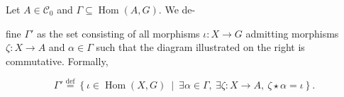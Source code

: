    
   
   
   
   
   \begin{definition}
       \label{def:weight_excluding}
       Let \( A \mathop{\in} \mathcal{C}_0 \) and $\Gamma \mathop{\subseteq} \operatorname{Hom}(A,G)$. We de-
       \newline
       \noindent
       \begin{minipage}{0.6\textwidth}
         fine $\Gamma'$ as the set consisting of all morphisms \( \iota : X \mathop{\to} G \) admitting morphisms \( \zeta \mathop{\colon} X \mathop{\to} A \) and \( \alpha \mathop{\in} \Gamma \) such that the diagram illustrated on the right is commutative. Formally, 
       \end{minipage}
       \begin{minipage}{0.4\textwidth}
           \hfill 
       \end{minipage}
   
       \[
       \Gamma' \overset{\operatorname{def}}{=} \left\{ \iota \mathop{\in} \operatorname{Hom}(X, G)~\middle|~\exists \alpha \mathop{\in} \Gamma,~\exists \zeta:X \mathop{\to} A,~\zeta \mathop{\star} \alpha \mathop{=} \iota \right\}.
       \]
   

\end{definition}
